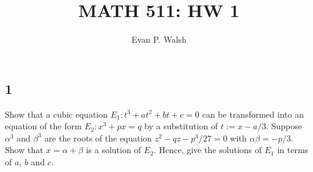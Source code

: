 \documentclass[12pt]{article}
\title{MATH 511: HW 1}
\author{Evan P. Walsh}
\begin{document}
\maketitle


\subsection*{1}
\begin{tcolorbox}
Show that a cubic equation $E_{1} : t^{3} + at^{2} + bt + c = 0$ can be transformed into an equation of the form $E_{2} : x^{3} + px = q$ by a
substitution of $t := x - a/3$. Suppose $\alpha^{3}$ and $\beta^{3}$ are the roots of the equation $z^{2} - qz - p^{3}/27 = 0$ with $\alpha\beta =
-p/3$. Show that $x = \alpha + \beta$ is a solution of $E_{2}$. Hence, give the solutions of $E_{1}$ in terms of $a$, $b$ and $c$.
\end{tcolorbox}
\end{document}
